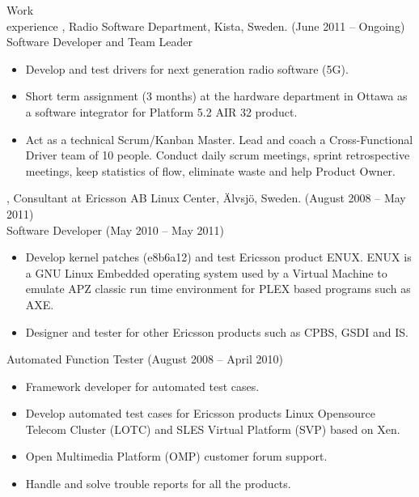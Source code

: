 \documentclass{../../cls/cv}
\author{Samuel Gabrielsson - Curriculum Vitae}
\begin{document}
\maketitle

\begin{category}{Work \\experience}
, Radio Software Department, Kista, Sweden. (June 2011 -- Ongoing)\\
Software Developer and Team Leader
\begin{itemize}
   \item Develop and test drivers for next generation radio software (5G).
   \item Short term assignment (3 months) at the hardware department in Ottawa as a software integrator for Platform 5.2 AIR 32 product.
   \item Act as a technical Scrum/Kanban Master. Lead and coach a Cross-Functional Driver team of 10 people. Conduct daily scrum meetings, sprint retrospective meetings, keep statistics of flow, eliminate waste and help Product Owner.
\end{itemize}

, Consultant at Ericsson AB Linux Center, \"Alvsj\"o, Sweden. (August 2008 -- May 2011)\\
Software Developer (May 2010 -- May 2011)
\begin{itemize}
   \item Develop kernel patches (e8b6a12) and test Ericsson product ENUX. ENUX is a GNU Linux Embedded operating system used by a Virtual Machine to emulate APZ classic run time environment for PLEX based programs such as AXE.
   \item Designer and tester for other Ericsson products such as CPBS, GSDI and IS.
\end{itemize}
Automated Function Tester (August 2008 -- April 2010)
\begin{itemize}
   \item Framework developer for automated test cases.
   \item Develop automated test cases for Ericsson products Linux Opensource Telecom Cluster (LOTC) and SLES Virtual Platform (SVP) based on Xen.
   \item Open Multimedia Platform (OMP) customer forum support.
   \item Handle and solve trouble reports for all the products.
\end{itemize}


\end{category}
\end{document}

